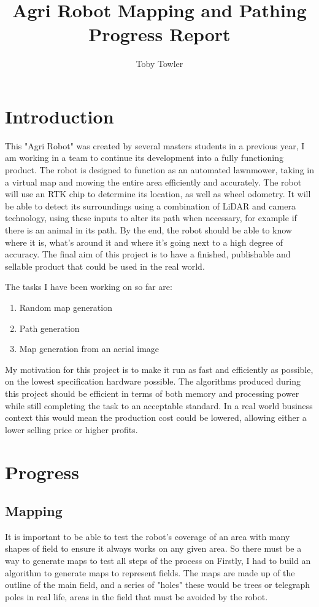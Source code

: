 \documentclass[progress]{cmpreport}
\title{Agri Robot Mapping and Pathing Progress Report}
\author{Toby Towler}
\begin{document}
\maketitle

\section{Introduction}
This "Agri Robot" was created by several masters students in a previous year,
I am working in a team to continue its development into a fully functioning product.
The robot is designed to function as an automated lawnmower, taking in a virtual map and mowing the entire area efficiently and accurately.
The robot will use an RTK chip to determine its location, as well as wheel odometry.
It will be able to detect its surroundings using a combination of LiDAR and camera technology, using these inputs to alter its path when necessary, for example if there is an animal in its path.
By the end, the robot should be able to know where it is, what's around it and where it's going next to a high degree of accuracy.
The final aim of this project is to have a finished, publishable and sellable product that could be used in the real world.

The tasks I have been working on so far are:
\begin{enumerate}
	\item {Random map generation}
	\item {Path generation}
	\item {Map generation from an aerial image}
\end{enumerate}

My motivation for this project is to make it run as fast and efficiently as possible, on the lowest specification hardware possible.
The algorithms produced during this project should be efficient in terms of both memory and processing power while still completing the task to an acceptable standard.
In a real world business context this would mean the production cost could be lowered, allowing either a lower selling price or higher profits.



\section{Progress}
\subsection{Mapping}
It is important to be able to test the robot's coverage of an area with many shapes of field to ensure it always works on any given area.
So there must be a way to generate maps to test all steps of the process on
Firstly, I had to build an algorithm to generate maps to represent fields. The maps are made up of the outline of the main field,
and a series of "holes" these would be trees or telegraph poles in real life, areas in the field that must be avoided by the robot.
\end{document}
